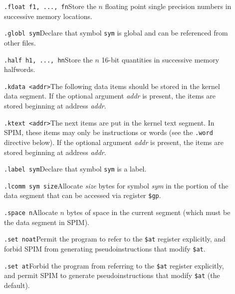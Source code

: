 \documentclass[11pt]{article}
\begin{document}
\begin{description}
  \item [] {\tt .float f1, ..., fn}\newline Store the $n$ floating
point single precision numbers in successive memory locations.

  \item [] {\tt .globl sym}\newline Declare that symbol {\tt sym} is
global and can be referenced from other files.

  \item [] {\tt .half h1, ..., hn}\newline Store the $n$ 16-bit
quantities in successive memory halfwords.

  \item [] {\tt .kdata <addr>}\newline The following data items should
be stored in the kernel data segment. If the optional argument {\em
addr\/} is present, the items are stored beginning at address {\em
addr\/}.

  \item [] {\tt .ktext <addr>}\newline The next items are put in the
kernel text segment.  In SPIM, these items may only be instructions or
words (see the {\tt .word} directive below). If the optional argument
{\em addr\/} is present, the items are stored beginning at address
{\em addr\/}.

  \item [] {\tt .label sym}\newline Declare that symbol {\tt sym} is a
label.

  \item [] {\tt .lcomm sym size}\newline Allocate {\em size} bytes
for symbol {\em sym} in the portion of the data segment that can be
accessed via register {\tt \$gp}.

  \item [] {\tt .space n}\newline Allocate $n$ bytes of space in the
current segment (which must be the data segment in SPIM).

  \item [] {\tt .set noat}\newline Permit the program to refer to the
{\tt \$at} register explicitly, and forbid SPIM from generating pseudoinstructions
that modify {\tt \$at}.

  \item [] {\tt .set at}\newline Forbid the program from referring to the
{\tt \$at} register explicitly, and permit SPIM to generate pseudoinstructions
that modify {\tt \$at} (the default).


\end{description}
\end{document}
